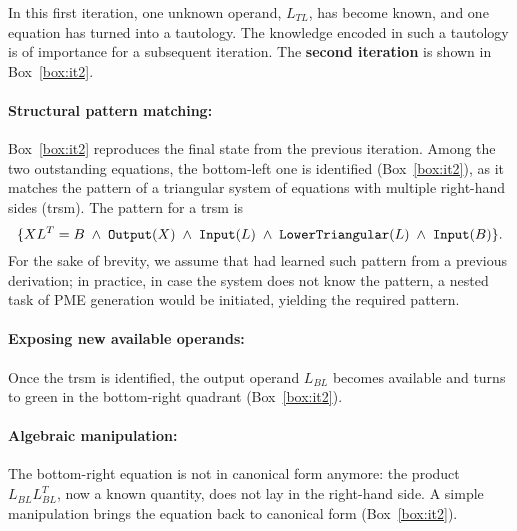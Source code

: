\documentclass{llncs}
\newcommand{\click}{{\sc{Cl\makebox[.58\width][c]{1}ck}}}
\newcommand{\prop}[2]{{\tt{#1(}}#2{\tt{)}}}
\begin{document}
In this first iteration, one unknown operand, $L_{TL}$, has become known, 
and one equation has turned into a tautology.
The knowledge encoded in such a tautology is of importance for a subsequent iteration.
The {\bf second iteration} is shown in Box~\ref{box:it2}.

\paragraph{\bf Structural pattern matching:} 
Box~\ref{box:it2}
reproduces
the final state from the previous iteration.
Among the two outstanding equations,
the bottom-left one is identified (Box~\ref{box:it2}),
as it matches the pattern 
of a triangular system of equations with multiple right-hand sides ({\sc trsm}).
The pattern for a {\sc trsm} is
\begin{equation} \nonumber
\{
 X L^T = B \; \wedge \;
\prop{Output}{X} \; \wedge \; \prop{Input}{L} \; \wedge \;
\prop{LowerTriangular}{L} \; \wedge \; \prop{Input}{B} \}.
\end{equation}
For the sake of brevity,
we assume that \click{}
had learned such pattern from a previous derivation; 
in practice, in case the system does not know the pattern,
a nested task of PME generation would be initiated, 
yielding the required pattern.

\paragraph{\bf Exposing new available operands:} 
Once the {\sc trsm} is identified, the output operand $L_{BL}$ becomes
available and turns to green in the bottom-right quadrant
(Box~\ref{box:it2}).

\paragraph{\bf Algebraic manipulation:} 
The bottom-right equation is not in canonical form anymore:
the product $L_{BL} L_{BL}^T$, now a known quantity,
does not lay in the right-hand side. A simple manipulation
brings the equation back to canonical form (Box~\ref{box:it2}).
\end{document}
